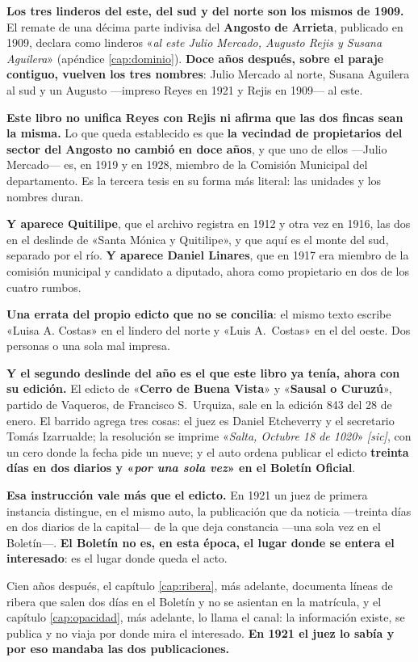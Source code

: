 \begin{cautela}
\textbf{Los tres linderos del este, del sud y del norte son los mismos de 1909.} El remate de una
décima parte indivisa del \textbf{Angosto de Arrieta}, publicado en 1909, declara como linderos
«\textit{al este Julio Mercado, Augusto Rejis y Susana Aguilera}» (apéndice
\ref{cap:dominio}). \textbf{Doce años después, sobre el paraje contiguo, vuelven los tres
nombres}: Julio Mercado al norte, Susana Aguilera al sud y un Augusto ---impreso Reyes en 1921 y
Rejis en 1909--- al este.

\textbf{Este libro no unifica Reyes con Rejis ni afirma que las dos fincas sean la misma.} Lo que
queda establecido es que \textbf{la vecindad de propietarios del sector del Angosto no cambió en
doce años}, y que uno de ellos ---Julio Mercado--- es, en 1919 y en 1928, miembro de la Comisión
Municipal del departamento. Es la tercera tesis en su forma más literal: las unidades y los
nombres duran.

\textbf{Y aparece Quitilipe}, que el archivo registra en 1912 y otra vez en 1916, las dos en el
deslinde de «Santa Mónica y Quitilipe», y que aquí es el monte del sud, separado por el río. \textbf{Y aparece Daniel
Linares}, que en 1917 era miembro de la comisión municipal y candidato a
diputado, ahora como propietario en dos de los cuatro rumbos.

\textbf{Una errata del propio edicto que no se concilia}: el mismo texto escribe «Luisa A.
Costas» en el lindero del norte y «Luis A.\ Costas» en el del oeste. Dos personas o una sola mal
impresa.
\end{cautela}

\textbf{Y el segundo deslinde del año es el que este libro ya tenía, ahora con su edición.} El
edicto de «\textbf{Cerro de Buena Vista}» y «\textbf{Sausal o Curuzú}», partido de Vaqueros, de
Francisco S.\ Urquiza, sale en la edición 843 del 28 de enero. El
barrido agrega tres cosas: el juez es Daniel Etcheverry y el secretario Tomás Izarrualde; la
resolución se imprime «\textit{Salta, Octubre 18 de 1020}» \textit{[sic]}, con un cero donde la
fecha pide un nueve; y el auto ordena publicar el edicto \textbf{treinta días en dos diarios y
«\textit{por una sola vez}» en el Boletín Oficial}.

\begin{cautela}
\textbf{Esa instrucción vale más que el edicto.} En 1921 un juez de primera instancia distingue,
en el mismo auto, la publicación que da noticia ---treinta días en dos diarios de la capital---
de la que deja constancia ---una sola vez en el Boletín---. \textbf{El Boletín no es, en esta
época, el lugar donde se entera el interesado}: es el lugar donde queda el acto.

Cien años después, el capítulo \ref{cap:ribera}, más adelante, documenta líneas de ribera que salen dos días en
el Boletín y no se asientan en la matrícula, y el capítulo \ref{cap:opacidad}, más adelante, lo llama el canal:
la información existe, se publica y no viaja por donde mira el interesado. \textbf{En 1921 el
juez lo sabía y por eso mandaba las dos publicaciones.}
\end{cautela}

